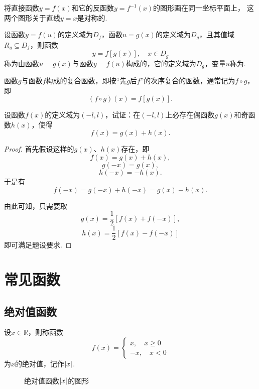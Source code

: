 \begin{property}
将直接函数\(y=f(x)\)和它的反函数\(y=f^{-1}(x)\)的图形画在同一坐标平面上，%
这两个图形关于直线\(y=x\)是对称的.
\end{property}

\begin{definition}
设函数\(y=f(u)\)的定义域为\(D_f\)，函数\(u=g(x)\)的定义域为\(D_g\)，且其值域\(R_g \subseteq D_f\)，则函数\[
y = f[g(x)],
\quad x \in D_g
\]称为由函数\(u=g(x)\)与函数\(y=f(u)\)构成的，它的定义域为\(D_g\)，变量\(u\)称为.

函数\(g\)与函数\(f\)构成的复合函数，即按“先\(g\)后\(f\)”的次序复合的函数，通常记为\(f \circ g\)，即\[
(f \circ g)(x) = f[g(x)].
\]
\end{definition}

\begin{example}
设函数\(f(x)\)的定义域为\((-l,l)\)，试证：在\((-l,l)\)上必存在偶函数\(g(x)\)和奇函数\(h(x)\)，使得\[
f(x) = g(x)+h(x).
\]
\begin{proof}
首先假设这样的\(g(x)\)、\(h(x)\)存在，即\[
f(x) = g(x) + h(x),
\]\[
g(-x) = g(x),
\]\[
h(-x) = -h(x).
\]于是有\[
f(-x) = g(-x) + h(-x) = g(x) - h(x).
\]

由此可知，只需要取\[
g(x) = \frac{1}{2} [f(x) + f(-x)],
\]\[
h(x) = \frac{1}{2} [f(x) - f(-x)]
\]即可满足题设要求.
\end{proof}
\end{example}

\section{常见函数}
\subsection{绝对值函数}
\begin{definition}[绝对值]
设\(x \in \mathbb{R}\)，则称函数\[
f(x) = \left\{ \begin{array}{c}
x, \quad x \geqslant 0 \\
-x, \quad x < 0
\end{array} \right.
\]为\(x\)的绝对值，记作\(\abs{x}\).
\end{definition}

\begin{figure}[ht]
\centering
{}
\caption{绝对值函数\(\abs{x}\)的图形}
\end{figure}

